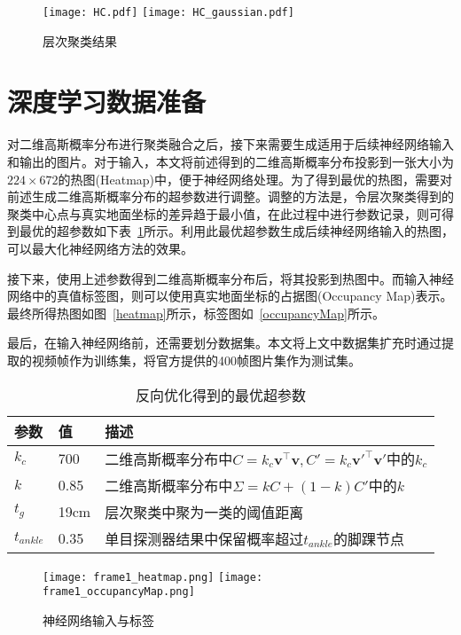 \begin{figure}
    \centering
    \subcaptionbox{\label{HC_a}}
      {\texttt{[image: HC.pdf]}}
    \subcaptionbox{\label{HC_b}}
      {\texttt{[image: HC\_gaussian.pdf]}}
    \caption{层次聚类结果}
    \label{HC}
\end{figure}

\section{深度学习数据准备}

对二维高斯概率分布进行聚类融合之后，接下来需要生成适用于后续神经网络输入和输出的图片。对于输入，本文将前述得到的二维高斯概率分布投影到一张大小为$224\times672$的热图(Heatmap)中，便于神经网络处理。为了得到最优的热图，需要对前述生成二维高斯概率分布的超参数进行调整。调整的方法是，令层次聚类得到的聚类中心点与真实地面坐标的差异趋于最小值，在此过程中进行参数记录，则可得到最优的超参数如下表~\ref{parameter_table}所示。利用此最优超参数生成后续神经网络输入的热图，可以最大化神经网络方法的效果。

接下来，使用上述参数得到二维高斯概率分布后，将其投影到热图中。而输入神经网络中的真值标签图，则可以使用真实地面坐标的占据图(Occupancy Map)\cite{fleuret2007multicamera}表示。最终所得热图如图~\ref{heatmap}所示，标签图如~\ref{occupancyMap}所示。

最后，在输入神经网络前，还需要划分数据集。本文将上文中数据集扩充时通过提取的视频帧作为训练集，将官方提供的400帧图片集作为测试集。
\begin{table}
    \centering
    \caption{反向优化得到的最优超参数}
    \begin{tabular}{lll}
        \toprule
        参数 & 值  & 描述         \\
        \midrule
        $k_{c}$ & 700 & 二维高斯概率分布中$C=k_{c}\bm{v}^\top\bm{v}, C'=k_{c}\bm{v}'^\top\bm{v}'$中的$k_{c}$ \\
        $k$   & 0.85 &  二维高斯概率分布中$\Sigma=kC + (1-k)C'$中的$k$   \\
        $t_{g}$ & 19cm &  层次聚类中聚为一类的阈值距离  \\
        $t_{ankle}$ & 0.35 &  单目探测器结果中保留概率超过$t_{ankle}$的脚踝节点 \\
        \bottomrule
    \end{tabular}
    \label{parameter_table}
\end{table}

\begin{figure}
    \centering
      {\texttt{[image: frame1\_heatmap.png]}}
      \quad
      {\texttt{[image: frame1\_occupancyMap.png]}}
    \caption{神经网络输入与标签}
    \label{inputs_outputs}
\end{figure}



